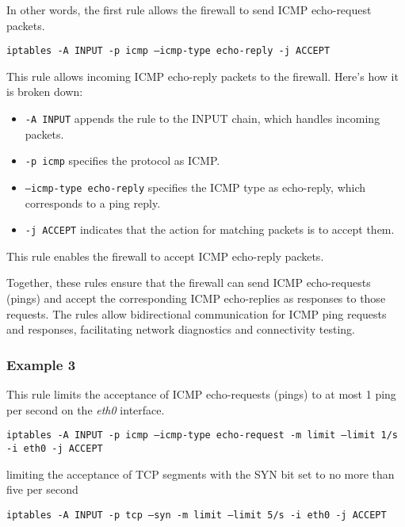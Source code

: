 {{		In other words, the first rule allows the firewall to send ICMP echo-request packets.
		
		\texttt{iptables -A INPUT -p icmp --icmp-type echo-reply -j ACCEPT}
		
		This rule allows incoming ICMP echo-reply packets to the firewall. Here's how it is broken down:
		
		\begin{itemize}
			\item \texttt{-A INPUT} appends the rule to the INPUT chain, which handles incoming packets.
			\item \texttt{-p icmp} specifies the protocol as ICMP.
			\item \texttt{--icmp-type echo-reply} specifies the ICMP type as echo-reply, which corresponds to a ping reply.
			\item \texttt{-j ACCEPT} indicates that the action for matching packets is to accept them.
		\end{itemize}
		
		This rule enables the firewall to accept ICMP echo-reply packets.
		
		Together, these rules ensure that the firewall can send ICMP echo-requests (pings) and accept the corresponding ICMP echo-replies as responses to those requests. The rules allow bidirectional communication for ICMP ping requests and responses, facilitating network diagnostics and connectivity testing.}
	
	\newpage		
	\subsubsection{Example 3}
			This rule limits the acceptance of ICMP echo-requests (pings) to at most 1 ping per second on the \textit{eth0} interface.
			\begin{itemize}
				\begin{sloppypar}
				\item \texttt{iptables -A INPUT -p icmp --icmp-type echo-request -m limit --limit 1/s -i eth0 -j ACCEPT}
				\end{sloppypar}
			\end{itemize}
				limiting the acceptance of TCP segments with the SYN bit set 
				to no more than five per second
		\begin{itemize}
			\begin{sloppypar}
				\item \texttt{iptables -A INPUT -p tcp --syn -m limit --limit 5/s -i eth0 -j ACCEPT}\\
			\end{sloppypar}
		\end{itemize}
	
}
